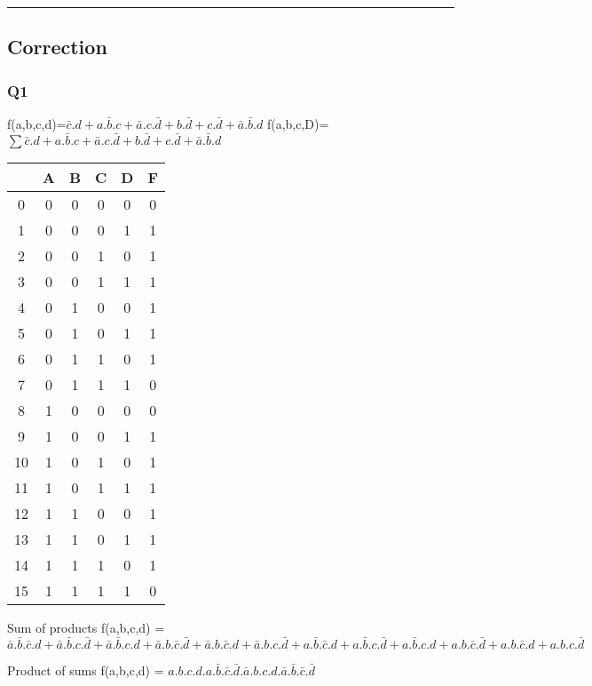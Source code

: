 \hrule width 1\linewidth\pagebreak
\subsection{Correction}

\subsubsection{Q1}

f(a,b,c,d)=$\bar c.d+a.\bar b.c+\bar a.c.\bar d + b.\bar d+c.\bar d+\bar a.\bar b.d$
f(a,b,c,D)=$ \sum \bar c.d+a.\bar b.c+\bar a.c.\bar d + b.\bar d+c.\bar d+\bar a.\bar b.d $ 

        \begin{tabular}{|c|c|c|c|c||c|}
    \toprule
         & A & B & C & D & F\\ \midrule0 & 0 & 0 & 0 & 0 & 0\\1 & 0 & 0 & 0 & 1 & 1\\2 & 0 & 0 & 1 & 0 & 1\\3 & 0 & 0 & 1 & 1 & 1\\\midrule4 & 0 & 1 & 0 & 0 & 1\\5 & 0 & 1 & 0 & 1 & 1\\6 & 0 & 1 & 1 & 0 & 1\\7 & 0 & 1 & 1 & 1 & 0\\\midrule8 & 1 & 0 & 0 & 0 & 0\\9 & 1 & 0 & 0 & 1 & 1\\10 & 1 & 0 & 1 & 0 & 1\\11 & 1 & 0 & 1 & 1 & 1\\\midrule12 & 1 & 1 & 0 & 0 & 1\\13 & 1 & 1 & 0 & 1 & 1\\14 & 1 & 1 & 1 & 0 & 1\\15 & 1 & 1 & 1 & 1 & 0\\\bottomrule
        \end{tabular}
        
Sum of products 
 f(a,b,c,d) = $\bar a.\bar b.\bar c.d + \bar a.\bar b.c.\bar d + \bar a.\bar b.c.d + \bar a.b.\bar c.\bar d + \bar a.b.\bar c.d + \bar a.b.c.\bar d + a.\bar b.\bar c.d + a.\bar b.c.\bar d + a.\bar b.c.d + a.b.\bar c.\bar d + a.b.\bar c.d + a.b.c.\bar d$

Product of sums 
 f(a,b,c,d) = $a.b.c.d.a.\bar b.\bar c.\bar d.\bar a.b.c.d.\bar a.\bar b.\bar c.\bar d$

